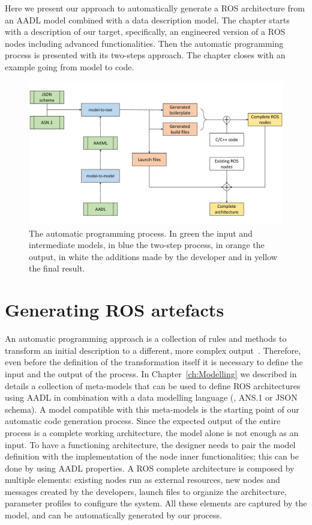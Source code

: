 Here we present our approach to automatically generate a ROS architecture from an AADL model combined with a data description model. The chapter starts with a description of our target, specifically, an engineered version of a ROS nodes including advanced functionalities. Then the automatic programming process is presented with its two-steps approach. The chapter closes with an example going from model to code.

\minitoc
\newpage

\begin{figure}[t]
    \centering
    \includegraphics[width=\textwidth]{gfx/code-gen-process}
    \caption[The automatic programming process.]{The automatic programming process. In green the input and intermediate models, in blue the two-step process, in orange the output, in white the additions made by the developer and in yellow the final result.}\label{fig:code-gen}
\end{figure}

\section{Generating ROS artefacts}
An automatic programming approach is a collection of rules and methods to transform an initial description to a different, more complex output~\cite{balzer198515}. Therefore, even before the definition of the transformation itself it is necessary to define the input and the output of the process. In Chapter~\ref{ch:Modelling} we described in details a collection of meta-models that can be used to define ROS architectures using AADL in combination with a data modelling language (\ie, ANS.1 or JSON schema). A model compatible with this meta-models is the starting point of our automatic code generation process. Since the expected output of the entire process is a complete working architecture, the model alone is not enough as an input. To have a functioning architecture, the designer needs to pair the model definition with the implementation of the node inner functionalities; this can be done by using AADL properties. A ROS complete architecture is composed by multiple elements: existing nodes run as external resources, new nodes and messages created by the developers, launch files to organize the architecture, parameter profiles to configure the system. All these elements are  captured by the model, and can be automatically generated by our process. 

